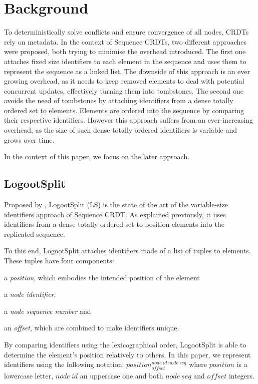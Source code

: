 \documentclass[sigplan,10pt]{acmart}
\newcommand{\trm}[1]{\mathit{#1}}
\newcommand{\id}[3]{$\trm{#1}^{\trm{#2}}_{\trm{#3}}$}
\begin{document}
\section{Background}
\label{sec:background}

To deterministically solve conflicts and ensure convergence of all nodes, \acp{CRDT} rely on metadata.
In the context of Sequence \acp{CRDT}, two different approaches were proposed, both trying to minimise the overhead introduced.
The first one \cite{oster:inria-00108523, ROH2011354,briot:hal-01343941} attaches fixed size identifiers to each element in the sequence and uses them to represent the sequence as a linked list.
The downside of this approach is an ever growing overhead, as it needs to keep removed elements to deal with potential concurrent updates, effectively turning them into tombstones.
The second one \cite{5158449,WeissICDCS09,AndreCollaborateCom2013} avoids the need of tombstones by attaching identifiers from a dense totally ordered set to elements.
Elements are ordered into the sequence by comparing their respective identifiers.
However this approach suffers from an ever-increasing overhead, as the size of such dense totally ordered identifiers is variable and grows over time.

In the context of this paper, we focus on the later approach.

\subsection{LogootSplit}

Proposed by \citet{AndreCollaborateCom2013}, LogootSplit (LS) is the state of the art of the variable-size identifiers approach of Sequence \ac{CRDT}.
As explained previously, it uses identifiers from a dense totally ordered set to position elements into the replicated sequence.

To this end, LogootSplit attaches identifiers made of a list of tuples to elements.
These tuples have four components:
\begin{enumerate*}
    \item a \emph{position}, which embodies the intended position of the element
    \item a \emph{node identifier},
    \item a \emph{node sequence number} and
    \item an \emph{offset}, which are combined to make identifiers unique.
\end{enumerate*}
By comparing identifiers using the lexicographical order, LogootSplit is able to determine the element's position relatively to others.
In this paper, we represent identifiers using the following notation: \id{position}{node~id~node~seq}{offset} where $\trm{position}$ is a lowercase letter, $\trm{node~id}$ an uppercase one and both $\trm{node~seq}$ and $\trm{offset}$ integers.
\end{document}
